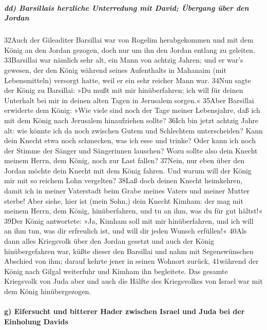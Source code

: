 \hypertarget{dd-barsillais-herzliche-unterredung-mit-david-uxfcbergang-uxfcber-den-jordan}{%
\subparagraph{dd) Barsillais herzliche Unterredung mit David; Übergang
über den
Jordan}\label{dd-barsillais-herzliche-unterredung-mit-david-uxfcbergang-uxfcber-den-jordan}}

32Auch der Gileaditer Barsillai war von Rogelim herabgekommen und mit
dem König an den Jordan gezogen, doch nur um ihn den Jordan entlang zu
geleiten. 33Barsillai war nämlich sehr alt, ein Mann von achtzig Jahren;
und er war's gewesen, der den König während seines Aufenthalts in
Mahanaim (mit Lebensmitteln) versorgt hatte, weil er ein sehr reicher
Mann war. 34Nun sagte der König zu Barsillai: »Du mußt mit mir
hinüberfahren; ich will für deinen Unterhalt bei mir in deinen alten
Tagen in Jerusalem sorgen.« 35Aber Barsillai erwiderte dem König: »Wie
viele sind noch der Tage meiner Lebensjahre, daß ich mit dem König nach
Jerusalem hinaufziehen sollte? 36Ich bin jetzt achtzig Jahre alt: wie
könnte ich da noch zwischen Gutem und Schlechtem unterscheiden? Kann
dein Knecht etwa noch schmecken, was ich esse und trinke? Oder kann ich
noch der Stimme der Sänger und Sängerinnen lauschen? Wozu sollte also
dein Knecht meinem Herrn, dem König, noch zur Last fallen? 37Nein, nur
eben über den Jordan möchte dein Knecht mit dem König fahren. Und warum
will der König mir mit so reichem Lohn vergelten? 38Laß doch deinen
Knecht heimkehren, damit ich in meiner Vaterstadt beim Grabe meines
Vaters und meiner Mutter sterbe! Aber siehe, hier ist (mein Sohn,) dein
Knecht Kimham: der mag mit meinem Herrn, dem König, hinüberfahren, und
tu an ihm, was du für gut hältst!« 39Der König antwortete: »Ja, Kimham
soll mit mir hinüberfahren, und ich will an ihm tun, was dir erfreulich
ist, und will dir jeden Wunsch erfüllen!« 40Als dann alles Kriegsvolk
über den Jordan gesetzt und auch der König hinübergefahren war, küßte
dieser den Barsillai und nahm mit Segenswünschen Abschied von ihm;
darauf kehrte jener in seinen Wohnort zurück, 41während der König nach
Gilgal weiterfuhr und Kimham ihn begleitete. Das gesamte Kriegsvolk von
Juda aber und auch die Hälfte des Kriegsvolkes von Israel war mit dem
König hinübergezogen.

\hypertarget{g-eifersucht-und-bitterer-hader-zwischen-israel-und-juda-bei-der-einholung-davids}{%
\paragraph{g) Eifersucht und bitterer Hader zwischen Israel und Juda bei
der Einholung
Davids}\label{g-eifersucht-und-bitterer-hader-zwischen-israel-und-juda-bei-der-einholung-davids}}

